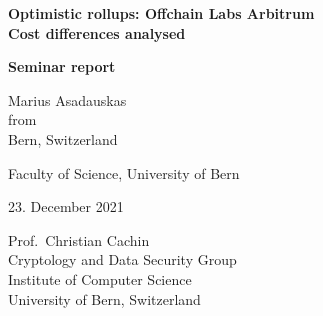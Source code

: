 \documentclass[a4paper,oneside,openright,11pt]{report}
\newcommand{\reporttitle}{Optimistic rollups: Offchain Labs Arbitrum}
\newcommand{\reportauthor}{Marius Asadauskas}
\newcommand{\reportauthororigin}{Bern, Switzerland}
\newcommand{\reportleiter}{Prof.\ Christian Cachin}
\newcommand{\reportsubtitle}{Cost differences analysed}
\newcommand{\reportdate}{23. December 2021}
\begin{document}

\begin{titlepage}  
  \thispagestyle{empty}

  \begin{center}  
    \begin{figure}[t]  
      \vspace{1in}     
    \end{figure}
    
    {\bfseries\Huge \reporttitle \\[2mm]
      \Large \reportsubtitle}\\
    \vspace{1.5cm}

    {\bfseries\LARGE Seminar report}\\
    \vspace{1.5cm}
    
    {\Large \reportauthor\\[2mm]
      from\\[2mm]
      \reportauthororigin}\\
    \vspace{1.5cm}

    {\Large Faculty of Science, University of Bern}\\
    \vspace{1.5cm}

    {\Large \reportdate}\\
    \vspace{1.5cm}

    \vspace*{\fill}
    {\Large
      \reportleiter\\
      Cryptology and Data Security Group\\
      Institute of Computer Science\\
      University of Bern, Switzerland\\}
  \end{center}
\end{titlepage}
\end{document}
